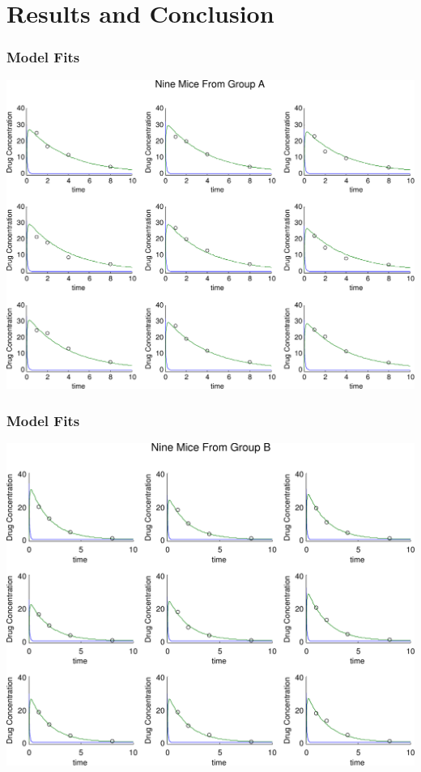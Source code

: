 \documentclass[t]{beamer}
\begin{document}
\section{Results and Conclusion}
\begin{frame}
  \frametitle{Model Fits}
  \includegraphics[width=\textwidth]{group_a_plotmatrix.pdf}
\end{frame}
\begin{frame}
  \frametitle{Model Fits}
  \includegraphics[width=\textwidth]{group_b_plotmatrix.pdf}
\end{frame}
\end{document}
